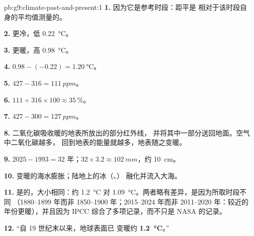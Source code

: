 \begin{solution}{pb:g9:climate-past-and-present:1}
\textbf{1.} 因为它是参考时段：距平是
相对于该时段自身的平均值测量的。

\textbf{2.} 更冷，低 \qty{0.22}{\degreeCelsius}。

\textbf{3.} 更暖，高 \qty{0.98}{\degreeCelsius}。

\textbf{4.} $0.98 - (-0.22) = \qty{1.20}{\degreeCelsius}$。

\textbf{5.} $427 - 316 = \qty{111}{ppm}$。

\textbf{6.} $111 \div 316 \times 100 \approx 35~\%$。

\textbf{7.} $427 - 300 = \qty{127}{ppm}$。

\textbf{8.} 二氧化碳吸收暖的地表所放出的部分红外线，
并将其中一部分送回地面。空气中二氧化碳越多，
回到地表的能量就越多，地表随之变暖。

\textbf{9.} $2025 - 1993 = 32$ 年；$32 \times 3.2 \approx
\qty{102}{mm}$，约 \qty{10}{cm}。

\textbf{10.} 变暖的海水膨胀；陆地上的冰（、）
融化并流入大海。

\textbf{11.} 是的，大小相同：约 \qty{1.2}{\degreeCelsius} 对
\qty{1.09}{\degreeCelsius}。两者略有差异，是因为所取时段不同
（1880--1899 年而非 1850--1900 年；2015--2024 年而非
2011--2020 年：较近的年份更暖），并且因为 IPCC
综合了多项记录，而不只是 NASA 的记录。

\textbf{12.} “自 19 世纪末以来，地球表面已
变暖约 \textbf{\qty{1.2}{\degreeCelsius}}。”
\end{solution}
